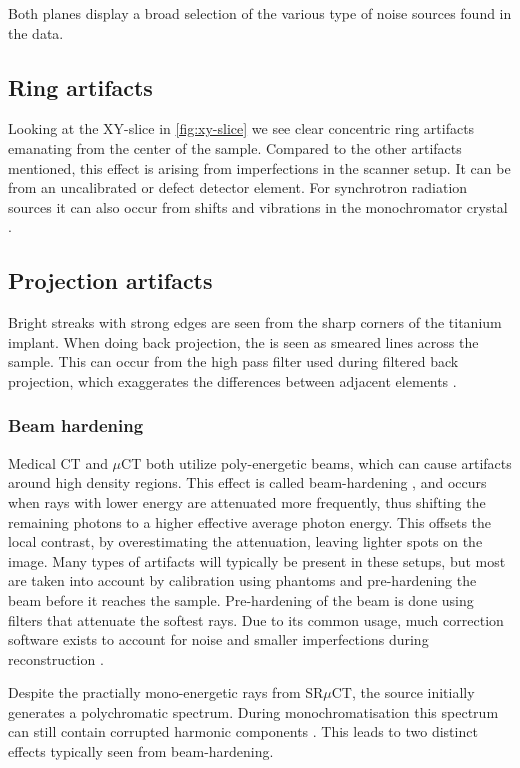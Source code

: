 Both planes display a broad selection of the various type of noise sources found in the data.

\subsection{Ring artifacts}

Looking at the XY-slice in \cref{fig:xy-slice} we see clear concentric ring artifacts emanating from
the center of the sample. Compared to the other artifacts mentioned, this effect is arising from
imperfections in the scanner setup. It can be from an uncalibrated or defect detector element. For
synchrotron radiation sources it can also occur from shifts and vibrations in the monochromator
crystal \citep{ringartifacts}.

\subsection{Projection artifacts}

Bright streaks with strong edges are seen from the sharp corners of the titanium implant. When
doing back projection, the  is seen as smeared lines across the sample. This
can occur from the high pass filter used during filtered back projection, which exaggerates the
differences between adjacent elements \citep{ctnoise}.

\subsubsection{Beam hardening}

Medical CT and $\mu$CT both utilize poly-energetic beams, which can cause artifacts around high
density regions. This effect is called beam-hardening , and occurs when rays with
lower energy are attenuated more frequently, thus shifting the remaining photons to a higher
effective average photon energy. This offsets the local contrast, by overestimating
the attenuation, leaving lighter spots on the image. Many types of artifacts will typically be
present in these setups, but most are taken into account by calibration using phantoms and
pre-hardening the beam before it reaches the sample. Pre-hardening of the beam is done using
filters that attenuate the softest rays. Due to its common usage, much correction software exists
to account for noise and smaller imperfections during reconstruction .

Despite the practially mono-energetic rays from SR$\mu$CT, the source initially generates a
polychromatic spectrum. During monochromatisation this spectrum can still contain corrupted harmonic
components \citep{srnoise}. This leads to two distinct effects typically seen from beam-hardening.


